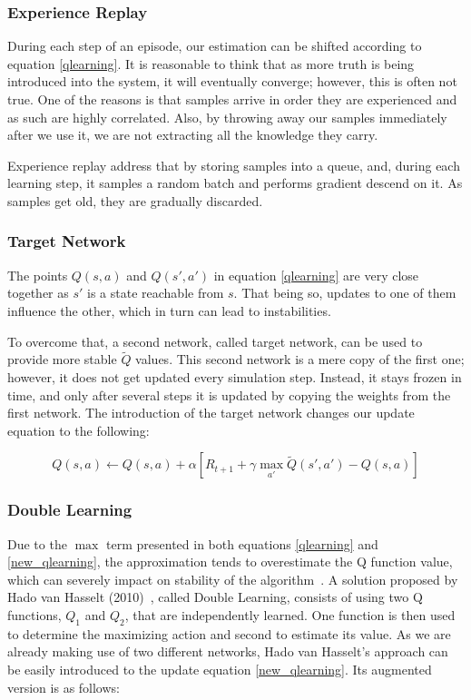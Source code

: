 \documentclass[11pt,twoside]{article}
\begin{document}
\subsubsection{Experience Replay}\label{experience}

During each step of an episode, our estimation can be shifted according to equation \ref{qlearning}. It is reasonable to think that as more truth is being introduced into the system, it will eventually converge; however, this is often not true. One of the reasons is that samples arrive in order they are experienced and as such are highly correlated. Also, by throwing away our samples immediately after we use it, we are not extracting all the knowledge they carry.

Experience replay address that by storing samples into a queue, and, during each learning step, it samples a random batch and performs gradient descend on it. As samples get old, they are gradually discarded.

\subsubsection{Target Network}

The points $Q(s, a)$ and $Q(s', a')$ in equation \ref{qlearning} are very close together as $s'$ is a state reachable from $s$. That being so, updates to one of them influence the other, which in turn can lead to instabilities.

To overcome that, a second network, called target network, can be used to provide more stable $\widetilde{Q}$ values. This second network is a mere copy of the first one; however, it does not get updated every simulation step. Instead, it stays frozen in time, and only after several steps it is updated by copying the weights from the first network. The introduction of the target network changes our update equation to the following:

\begin{equation} \label{new_qlearning}
	Q(s, a) \leftarrow Q(s, a) + \alpha [R_{t+1} + \gamma \max_{a'}\widetilde{Q}(s', a') - Q(s,a)]
\end{equation}


\subsubsection{Double Learning}\label{double_learning}

Due to the $\max$ term presented in both equations \ref{qlearning} and \ref{new_qlearning}, the approximation tends to overestimate the Q function value, which can severely impact on stability of the algorithm~\cite{overestimation}. A solution proposed by Hado van Hasselt (2010)~\cite{doubleq2010}, called Double Learning, consists of using two Q functions, $Q_1$ and $Q_2$, that are independently learned. One function is then used to determine the maximizing action and second to estimate its value. As we are already making use of two different networks, Hado van Hasselt's approach can be easily introduced to the update equation \ref{new_qlearning}. Its augmented version is as follows:
\end{document}
